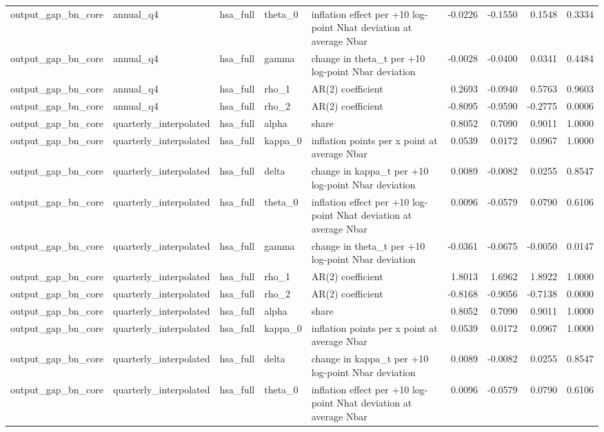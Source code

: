 \begin{tabular}{lllllrrrr}
output\_gap\_bn\_core & annual\_q4 & hsa\_full & theta\_0 & inflation effect per +10 log-point Nhat deviation at average Nbar & -0.0226 & -0.1550 & 0.1548 & 0.3334 \\
output\_gap\_bn\_core & annual\_q4 & hsa\_full & gamma & change in theta\_t per +10 log-point Nbar deviation & -0.0028 & -0.0400 & 0.0341 & 0.4484 \\
output\_gap\_bn\_core & annual\_q4 & hsa\_full & rho\_1 & AR(2) coefficient & 0.2693 & -0.0940 & 0.5763 & 0.9603 \\
output\_gap\_bn\_core & annual\_q4 & hsa\_full & rho\_2 & AR(2) coefficient & -0.8095 & -0.9590 & -0.2775 & 0.0006 \\
output\_gap\_bn\_core & quarterly\_interpolated & hsa\_full & alpha & share & 0.8052 & 0.7090 & 0.9011 & 1.0000 \\
output\_gap\_bn\_core & quarterly\_interpolated & hsa\_full & kappa\_0 & inflation points per x point at average Nbar & 0.0539 & 0.0172 & 0.0967 & 1.0000 \\
output\_gap\_bn\_core & quarterly\_interpolated & hsa\_full & delta & change in kappa\_t per +10 log-point Nbar deviation & 0.0089 & -0.0082 & 0.0255 & 0.8547 \\
output\_gap\_bn\_core & quarterly\_interpolated & hsa\_full & theta\_0 & inflation effect per +10 log-point Nhat deviation at average Nbar & 0.0096 & -0.0579 & 0.0790 & 0.6106 \\
output\_gap\_bn\_core & quarterly\_interpolated & hsa\_full & gamma & change in theta\_t per +10 log-point Nbar deviation & -0.0361 & -0.0675 & -0.0050 & 0.0147 \\
output\_gap\_bn\_core & quarterly\_interpolated & hsa\_full & rho\_1 & AR(2) coefficient & 1.8013 & 1.6962 & 1.8922 & 1.0000 \\
output\_gap\_bn\_core & quarterly\_interpolated & hsa\_full & rho\_2 & AR(2) coefficient & -0.8168 & -0.9056 & -0.7138 & 0.0000 \\
output\_gap\_bn\_core & quarterly\_interpolated & hsa\_full & alpha & share & 0.8052 & 0.7090 & 0.9011 & 1.0000 \\
output\_gap\_bn\_core & quarterly\_interpolated & hsa\_full & kappa\_0 & inflation points per x point at average Nbar & 0.0539 & 0.0172 & 0.0967 & 1.0000 \\
output\_gap\_bn\_core & quarterly\_interpolated & hsa\_full & delta & change in kappa\_t per +10 log-point Nbar deviation & 0.0089 & -0.0082 & 0.0255 & 0.8547 \\
output\_gap\_bn\_core & quarterly\_interpolated & hsa\_full & theta\_0 & inflation effect per +10 log-point Nhat deviation at average Nbar & 0.0096 & -0.0579 & 0.0790 & 0.6106 \\

\end{tabular}
